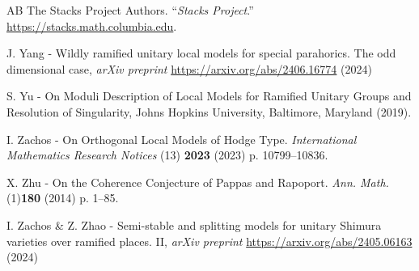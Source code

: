 \documentclass[pdflatex,sn-mathphys-num]{sn-jnl}%
\theoremstyle{thmstyleone}%
\theoremstyle{thmstyletwo}%
\numberwithin{equation}{subsection}
\theoremstyle{thmstylethree}%
\begin{document}
\begin{thebibliography}{AB}
The {Stacks Project Authors}. “\textit{Stacks Project}.” \url{https://stacks.math.columbia.edu}.

J. Yang - Wildly ramified unitary local models for special parahorics. The odd dimensional case,
\emph{arXiv preprint} \url{https://arxiv.org/abs/2406.16774} (2024)

S. Yu - On Moduli Description of Local Models for Ramified Unitary Groups and Resolution of Singularity, 
Johns Hopkins University, Baltimore, Maryland (2019).
			
I. Zachos - On Orthogonal Local Models of Hodge Type. 
\emph{International Mathematics Research Notices} (13) \textbf{2023} (2023) p. 10799–10836. 
			
X. Zhu - On the Coherence Conjecture of Pappas and Rapoport.
\emph{Ann. Math.} (1)\textbf{180} (2014) p. 1–85. 

I. Zachos \& Z. Zhao - Semi-stable and splitting models for unitary Shimura varieties over ramified places. II,
\emph{arXiv preprint} \url{https://arxiv.org/abs/2405.06163} (2024)



























\end{thebibliography}



\end{document}
